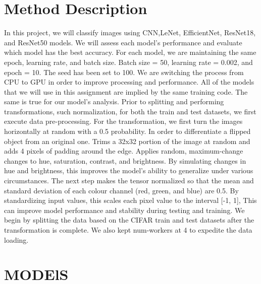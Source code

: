 \documentclass[10pt,twocolumn,letterpaper]{article}
\begin{document}
\section{Method Description}
In this project, we will classify images using  CNN,LeNet, EfficientNet, ResNet18, and ResNet50 models. We will assess each model's performance and evaluate which model has the best accuracy. For each model, we are maintaining the same epoch, learning rate, and batch size. Batch size = 50, learning rate = 0.002, and epoch = 10. The seed has been set to 100. We are switching the process from CPU to GPU in order to improve processing and performance. All of the models that we will use in this assignment are implied by the same training code. The same is true for our model's analysis. Prior to splitting and performing transformations, such normalization, for both the train and test datasets, we first execute data pre-processing. For the transformation, we first turn the images horizontally at random with a 0.5 probability. In order to differentiate a flipped object from an original one. Trims a 32x32 portion of the image at random and adds 4 pixels of padding around the edge. Applies random, maximum-change changes to hue, saturation, contrast, and brightness. By simulating changes in hue and brightness, this improves the model's ability to generalize under various circumstances. The next step makes the tensor normalized so that the mean and standard deviation of each colour channel (red, green, and blue) are 0.5. By standardizing input values, this scales each pixel value to the interval [-1, 1], This can improve model performance and stability during testing and training. We begin by splitting the data based on the CIFAR  train and test datasets after the transformation is complete. We also kept num-workers at 4 to expedite the data loading.
\section{MODElS}
\end{document}

